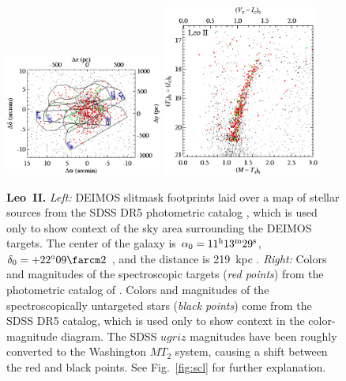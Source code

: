 \documentclass{emulateapj}
\begin{document}
\begin{figure}[hp!]
\centering
\includegraphics[width=0.46\textwidth]{leoii_coords_targets.eps}
\hfil
\includegraphics[width=0.46\textwidth]{leoii_cmd_targets.eps}
\caption{{\bf Leo~II.}  {\it Left:} DEIMOS slitmask footprints laid
  over a map of stellar sources from the SDSS DR5 photometric catalog
  \citep{ade07}, which is used only to show context of the sky area
  surrounding the DEIMOS targets.  The center of the galaxy is
  $\alpha_0 = 11^{\rm{h}}13^{\rm{m}}29^{\rm{s}}$, $\delta_0 =
  +22^{\circ}09 \farcm 2$ \citep{mat98}, and the distance is 219~kpc
  \citep{sie10}.  {\it Right:} Colors and magnitudes of the
  spectroscopic targets ({\it red points}) from the photometric
  catalog of \citet{sie10}.  Colors and magnitudes of the
  spectroscopically untargeted stars ({\it black points}) come from
  the SDSS DR5 catalog, which is used only to show context in the
  color-magnitude diagram.  The SDSS $ugriz$ magnitudes have been
  roughly converted to the Washington $MT_2$ system, causing a shift
  between the red and black points.  See Fig.~\ref{fig:scl} for
  further explanation.}
\end{figure}
\end{document}

